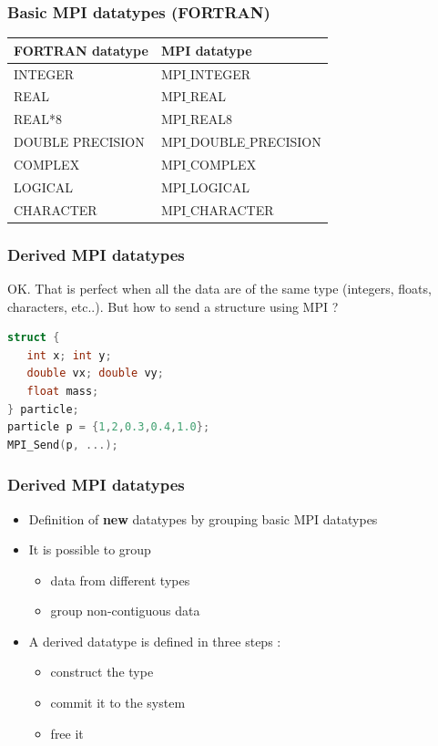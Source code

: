 \begin{frame}[containsverbatim]
\frametitle{Basic MPI datatypes (FORTRAN)}

\begin{center}
\begin{tabular}{ | l | l | }
	\hline 
	\textbf{FORTRAN datatype} & \textbf{MPI datatype} \\
	\hline 
	\hline 
	INTEGER & MPI$\_$INTEGER\\
	REAL & MPI$\_$REAL\\
	REAL*8 & MPI$\_$REAL8\\
	DOUBLE PRECISION & MPI$\_$DOUBLE$\_$PRECISION\\
	COMPLEX & MPI$\_$COMPLEX\\
	LOGICAL & MPI$\_$LOGICAL\\
	CHARACTER & MPI$\_$CHARACTER \\
	\hline 
 \end{tabular}
\end{center}
\end{frame}

\begin{frame}[containsverbatim]
\frametitle{Derived MPI datatypes}

OK. That is perfect when all the data are of the same type (integers, floats, characters, etc..). But how to send a structure using MPI ?

\begin{lstlisting}[language=C,frame=lines]
struct { 
   int x; int y;
   double vx; double vy;
   float mass;
} particle;
particle p = {1,2,0.3,0.4,1.0};
MPI_Send(p, ...);
\end{lstlisting}
\end{frame}


\begin{frame}[containsverbatim]
\frametitle{Derived MPI datatypes}
\begin{itemize}
	\item Definition of \textbf{new} datatypes by grouping basic MPI datatypes
	\item It is possible to group \begin{itemize} \item data from different types \item group non-contiguous data \end{itemize}
	\item A derived datatype is defined in three steps : \begin{itemize} \item construct the type \item commit it to the system \item free it \end{itemize}
\end{itemize}

\end{frame}



